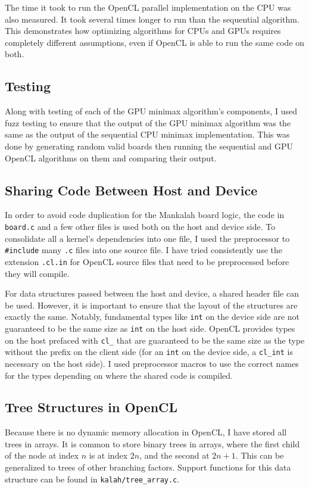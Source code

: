 \documentclass{article}
\begin{document}
The time it took to run the OpenCL parallel implementation on the CPU was also measured. It took several times longer to run than the sequential algorithm. This demonstrates how optimizing algorithms for CPUs and GPUs requires completely different assumptions, even if OpenCL is able to run the same code on both.

\subsection{Testing}
Along with testing of each of the GPU minimax algorithm's components, I used fuzz testing to ensure that the output of the GPU minimax algorithm was the same as the output of the sequential CPU minimax implementation. This was done by generating random valid boards then running the sequential and GPU OpenCL algorithms on them and comparing their output.

\subsection{Sharing Code Between Host and Device}
In order to avoid code duplication for the Mankalah board logic, the code in \texttt{board.c} and a few other files is used both on the host and device side. To consolidate all a kernel's dependencies into one file, I used the preprocessor to \texttt{\#include} many \texttt{.c} files into one source file. I have tried consistently use the extension \texttt{.cl.in} for OpenCL source files that need to be preprocessed before they will compile.

For data structures passed between the host and device, a shared header file can be used. However, it is important to ensure that the layout of the structures are exactly the same. Notably, fundamental types like \texttt{int} on the device side are not guaranteed to be the same size as \texttt{int} on the host side. OpenCL provides types on the host prefaced with \texttt{cl\_} that are guaranteed to be the same size as the type without the prefix on the client side (for an \texttt{int} on the device side, a \texttt{cl\_int} is necessary on the host side). I used preprocessor macros to use the correct names for the types depending on where the shared code is compiled.

\subsection{Tree Structures in OpenCL}
Because there is no dynamic memory allocation in OpenCL, I have stored all trees in arrays. It is common to store binary trees in arrays, where the first child of the node at index $n$ is at index $2n$, and the second at $2n + 1$. This can be generalized to trees of other branching factors. Support functions for this data structure can be found in \texttt{kalah/tree\_array.c}.
\end{document}
